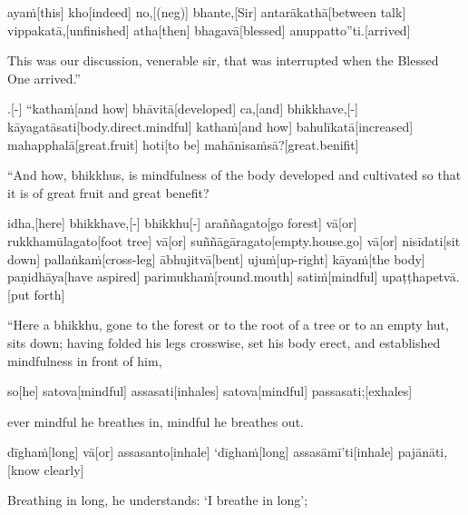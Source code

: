 \begin{samepage}
\begingl[glneveryline={\PaliGlossA,\PaliGlossB}]
ayaṁ[this] kho[indeed] no,[(neg)] bhante,[Sir] antarākathā[between talk] vippakatā,[unfinished] atha[then] bhagavā[blessed] anuppatto”ti.[arrived]
\endgl
\nopagebreak
\linespread{0.5}
\begin{spacin}{0.2}
{\PaliGlossFT This was our discussion, venerable sir, that was interrupted when the Blessed One arrived.”}
\end{spacin}
\vskip 12pt
\end{samepage}
\vskip 0.2in
\begin{samepage}
.[-] “kathaṁ[and how] bhāvitā[developed] ca,[and] bhikkhave,[-] kāyagatāsati[body.direct.mindful] kathaṁ[and how] bahulīkatā[increased] mahapphalā[great.fruit] hoti[to be] mahānisaṁsā?[great.benifit]
\endgl
\nopagebreak
\linespread{0.5}
\begin{spacin}{0.2}
{\PaliGlossFT “And how, bhikkhus, is mindfulness of the body developed and cultivated so that it is of great fruit and great benefit?}
\end{spacin}
\vskip 12pt
\end{samepage}
\begin{samepage}
\begingl[glneveryline={\PaliGlossA,\PaliGlossB}]
idha,[here] bhikkhave,[-] bhikkhu[-] araññagato[go forest] vā[or] rukkhamūlagato[foot tree] vā[or] suññāgāragato[empty.house.go] vā[or] nisīdati[sit down] pallaṅkaṁ[cross-leg] ābhujitvā[bent] ujuṁ[up-right] kāyaṁ[the body] paṇidhāya[have aspired] parimukhaṁ[round.mouth] satiṁ[mindful] upaṭṭhapetvā.[put forth]
\endgl
\nopagebreak
\linespread{0.5}
\begin{spacin}{0.2}
{\PaliGlossFT “Here a bhikkhu, gone to the forest or to the root of a tree or to an empty hut, sits down; having folded his legs crosswise, set his body erect, and established mindfulness in front of him,}
\end{spacin}
\vskip 12pt
\end{samepage}
\begin{samepage}
\begingl[glneveryline={\PaliGlossA,\PaliGlossB}]
so[he] satova[mindful] assasati[inhales] satova[mindful] passasati;[exhales]
\endgl
\nopagebreak
\linespread{0.5}
\begin{spacin}{0.2}
{\PaliGlossFT ever mindful he breathes in, mindful he breathes out.}
\end{spacin}
\vskip 12pt
\end{samepage}
\begin{samepage}
\begingl[glneveryline={\PaliGlossA,\PaliGlossB}]
dīghaṁ[long] vā[or] assasanto[inhale] ‘dīghaṁ[long] assasāmī’ti[inhale] pajānāti,[know clearly]
\endgl
\nopagebreak
\linespread{0.5}
\begin{spacin}{0.2}
{\PaliGlossFT Breathing in long, he understands: ‘I breathe in long’;}
\end{spacin}
\vskip 12pt
\end{samepage}
